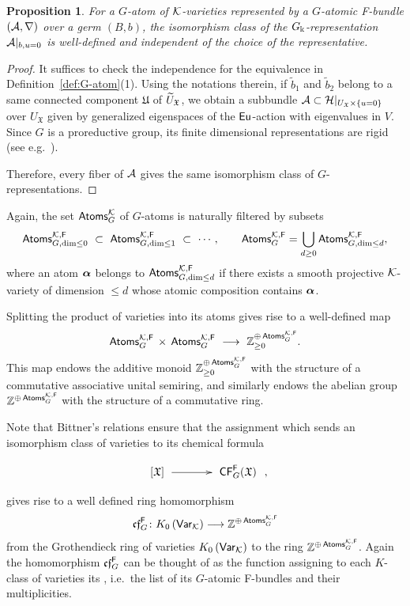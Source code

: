 \documentclass[twoside,leqno]{article}
\numberwithin{equation}{section}
\theoremstyle{plain}
\newtheorem{proposition}[equation]{Proposition}
\theoremstyle{definition}
\begin{document}
\begin{proposition} \label{prop:iso_of_representations}
  For a $G$-atom of $\mathcal K$-varieties represented by a $G$-atomic F-bundle $(\mathcal A,\nabla)$ over a germ $(B, b)$, the isomorphism class of the $G_{\Bbbk}$-representation $\mathcal A|_{b,u=0}$ is well-defined and independent of the choice of the representative.
\end{proposition}
\begin{proof}
  It suffices to check the independence for the equivalence in Definition~\ref{def:G-atom}(1).
  Using the notations therein, if $\tilde b_1$ and $\tilde b_2$ belong to a same connected component $\mathfrak{U}$ of $\widetilde U_{\mathfrak{X}}$, we obtain a subbundle $\mathcal A \subset \mathcal H|_{U_{\mathfrak{X}}\times \{u=0\}}$ over $U_{\mathfrak{X}}$ given by generalized eigenspaces of the $\operatorname{\mathsf{Eu}}$-action with eigenvalues in $V$.
  Since $G$ is a proreductive group, its finite dimensional representations are rigid (see e.g.\ \cite[Proposition~15.15]{milne-AG}).
  
  Therefore, every fiber of $\mathcal A$ gives the same isomorphism class of $G$-representations.
\end{proof}

\medskip


Again, the set $\mathsf{Atoms}_{G}^{\mathcal K}$ of $G$-atoms is naturally filtered by subsets
\[\mathsf{Atoms}_{G,\dim \leq 0}^{\kay,\mathsf{F}} 
\ \subset \ \mathsf{Atoms}_{G,\dim \leq 1}^{\kay,\mathsf{F}} \ \subset \ \cdots,  \qquad 
\mathsf{Atoms}_{G}^{\kay,\mathsf{F}}=\bigcup_{d\geq 0}\mathsf{Atoms}_{G,\dim \leq d}^{\kay,\mathsf{F}},
\]
where an atom $\boldsymbol{\alpha}$ belongs to  $\mathsf{Atoms}_{G,\dim \leq d}^{\mathcal K,\mathsf{F}}$ if there exists 
a smooth projective $\mathcal K$-variety of dimension $\leq d$ whose atomic composition contains $\boldsymbol{\alpha}$. 

\medskip


Splitting the  product of varieties into its atoms gives rise to a 
well-defined map
\[
\Atoms^{\kay,\mathsf{F}}_{G} \, \times \, \Atoms^{\kay,\mathsf{F}}_{G} \ 
\longrightarrow  \ \bbZ^{\oplus \, \Atoms^{\kay,\mathsf{F}}_{G}}_{\ge 0}.
\]
This map endows the additive monoid $\mathbb Z^{\oplus \, \mathsf{Atoms}^{\mathcal K,\mathsf{F}}_{G}}_{\ge 0}$
with the structure of a commutative associative unital semiring, and similarly endows the abelian group 
$\mathbb Z^{\oplus \, \mathsf{Atoms}^{\mathcal K,\mathsf{F}}_{G}}$
with the structure of a commutative ring.


\medskip


Note that Bittner's  relations \cite{Bittner} ensure  that the 
assignment which sends an isomorphism class of varieties to its chemical formula
\[
\xymatrix@1@C+1pc@M+0.5pc{[\mathfrak{X}]\ar[r] & \CF_{G}^{\mathsf{F}}(\mathfrak{X})},
\]
gives rise to a well defined ring 
homomorphism 
\[
\mathfrak{cf}_{G}^{\mathsf{F}} \colon K_0\left(\mathsf{Var}_{\mathcal K}\right) \longrightarrow  \mathbb Z^{\oplus \, \mathsf{Atoms}^{\mathcal K,\mathsf{F}}_{G}}
\]
from the Grothendieck ring of varieties $K_0\left(\mathsf{Var}_{\mathcal K}\right)$ to the ring 
$\mathbb Z^{\oplus \, \mathsf{Atoms}^{\mathcal K,\mathsf{F}}_{G}}$.
Again the homomorphism $\mathfrak{cf}_{G}^{\mathsf{F}}$ can be thought of as the function assigning to each $K$-class of varieties its , i.e.\ the list of its $G$-atomic F-bundles and their multiplicities.
\end{document}
